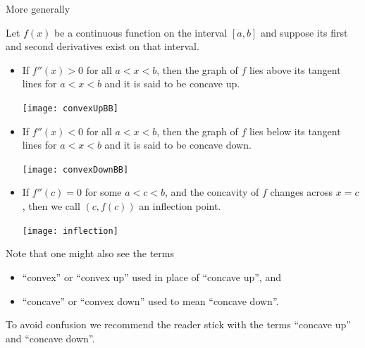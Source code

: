 More generally
\begin{defn}\label{def_3_6_1}
Let $f(x)$ be a continuous function on the interval $[a,b]$ and suppose its first and
second derivatives exist on that interval.
\begin{itemize}

\item If $f''(x)>0$ for all $a<x<b$, then the graph of $f$ lies above its tangent lines
for $a<x<b$ and it is said to be concave up.
\begin{efig}
\begin{center}
   \texttt{[image: convexUpBB]}
\end{center}
\end{efig}
\item If $f''(x)<0$ for all $a<x<b$, then the graph of $f$ lies below its tangent lines
for $a<x<b$ and it is said to be concave down.
\begin{efig}
\begin{center}
   \texttt{[image: convexDownBB]}
\end{center}
\end{efig}
\item If $f''(c)=0$ for some $a<c<b$, and the concavity of $f$ changes across $x=c$, then
we call $(c,f(c))$ an inflection point.
\begin{efig}
\begin{center}
   \texttt{[image: inflection]}
\end{center}
\end{efig}
\end{itemize}
\end{defn}
Note that one might also see the terms
\begin{itemize}
 \item ``convex'' or ``convex up'' used in place of ``concave up'', and
 \item ``concave'' or ``convex down'' used to mean ``concave down''.
\end{itemize}
To avoid confusion we recommend the reader stick with the terms ``concave up'' and
``concave down''.


